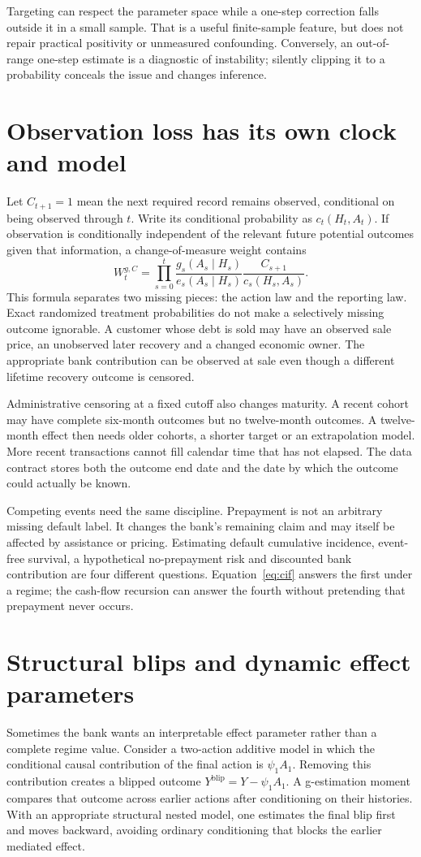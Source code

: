 Targeting can respect the parameter space while a one-step correction falls
outside it in a small sample. That is a useful finite-sample feature, but
does not repair practical positivity or unmeasured confounding. Conversely,
an out-of-range one-step estimate is a diagnostic of instability; silently
clipping it to a probability conceals the issue and changes inference.

\section{Observation loss has its own clock and model}
Let $C_{t+1}=1$ mean the next required record remains observed, conditional
on being observed through $t$. Write its conditional probability as
$c_t(H_t,A_t)$. If observation is conditionally independent of the relevant
future potential outcomes given that information, a change-of-measure
weight contains
\[
 W_t^{g,C}=\prod_{s=0}^{t}
 \frac{g_s(A_s\mid H_s)}{e_s(A_s\mid H_s)}
 \frac{C_{s+1}}{c_s(H_s,A_s)}.
\]
This formula separates two missing pieces: the action law and the reporting
law. Exact randomized treatment probabilities do not make a selectively
missing outcome ignorable. A customer whose debt is sold may have an
observed sale price, an unobserved later recovery and a changed economic
owner. The appropriate bank contribution can be observed at sale even
though a different lifetime recovery outcome is censored.

Administrative censoring at a fixed cutoff also changes maturity. A recent
cohort may have complete six-month outcomes but no twelve-month outcomes.
A twelve-month effect then needs older cohorts, a shorter target or an
extrapolation model. More recent transactions cannot fill calendar time
that has not elapsed. The data contract stores both the outcome end date
and the date by which the outcome could actually be known.

Competing events need the same discipline. Prepayment is not an arbitrary
missing default label. It changes the bank's remaining claim and may itself
be affected by assistance or pricing. Estimating default cumulative incidence,
event-free survival, a hypothetical no-prepayment risk and discounted bank
contribution are four different questions. Equation~\eqref{eq:cif} answers
the first under a regime; the cash-flow recursion can answer the fourth
without pretending that prepayment never occurs.

\section{Structural blips and dynamic effect parameters}
Sometimes the bank wants an interpretable effect parameter rather than a
complete regime value. Consider a two-action additive model in which the
conditional causal contribution of the final action is $\psi_1 A_1$.
Removing this contribution creates a blipped outcome
$Y^{\mathrm{blip}}=Y-\psi_1 A_1$. A g-estimation moment compares that
outcome across earlier actions after conditioning on their histories.
With an appropriate structural nested model, one estimates the final blip
first and moves backward, avoiding ordinary conditioning that blocks the
earlier mediated effect.

